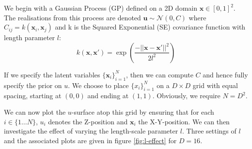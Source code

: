 \documentclass[]{article}
\newcommand{\Ncal}{\mathcal{N}}
\newcommand{\xbold}{\boldsymbol{x}}
\newcommand{\ubold}{\boldsymbol{u}}
\begin{document}
We begin with a Gaussian Process (GP) defined on a 2D domain $\xbold \in [0, 1]^2$. The realisations from this process are denoted $\ubold \sim \Ncal(0, C)$ where $C_{ij} = k(\xbold_i, \xbold_j)$ and k is the Squared Exponential (SE) covariance function with length parameter $l$:
%
\begin{equation}
	k(\xbold, \xbold ') = \exp \left( \frac{-||\xbold - \xbold '||^2}{2l^2}\right)
	\label{eqn:k-defn}
\end{equation}

If we specify the latent variables $\{\xbold_i\}_{i=1}^N$, then we can compute $C$ and hence fully specify the prior on $u$. We choose to place $\{x_i\}_{i=1}^N$ on a $D \times D$ grid with equal spacing, starting at $(0,0)$ and ending at $(1,1)$. Obviously, we require $N = D^2$.

We can now plot the $u$-surface atop this grid by ensuring that for each $i \in \{1 \dots N\}$, $u_i$ denotes the Z-position and $\xbold_i$ the X-Y-position. We can then investigate the effect of varying the length-scale parameter $l$. Three settings of $l$ and the associated plots are given in figure \ref{fig:l-effect} for $D=16$.
%
\end{document}
